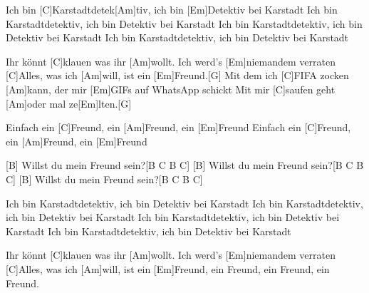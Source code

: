 

\begin{guitar}
	Ich bin [C]Karstadtdetek[Am]tiv, ich bin [Em]Detektiv bei Karstadt
	Ich bin Karstadtdetektiv, ich bin Detektiv bei Karstadt
	Ich bin Karstadtdetektiv, ich bin Detektiv bei Karstadt
	Ich bin Karstadtdetektiv, ich bin Detektiv bei Karstadt
	
	Ihr könnt [C]klauen was ihr [Am]wollt. Ich werd's [Em]niemandem verraten
	[C]Alles, was ich [Am]will, ist ein [Em]Freund.[G]{}
	Mit dem ich [C]FIFA zocken [Am]kann, der mir [Em]GIFs auf WhatsApp schickt
	Mit mir [C]saufen geht [Am]oder mal ze[Em]lten.[G]{}
	
	Einfach ein [C]Freund, ein [Am]Freund, ein [Em]Freund
	Einfach ein [C]Freund, ein [Am]Freund, ein [Em]Freund
	
	[B] Willst du mein Freund sein?[B C B C]{}
	[B] Willst du mein Freund sein?[B C B C]{}
	[B] Willst du mein Freund sein?[B C B C]{}
	
	Ich bin Karstadtdetektiv, ich bin Detektiv bei Karstadt
	Ich bin Karstadtdetektiv, ich bin Detektiv bei Karstadt
	Ich bin Karstadtdetektiv, ich bin Detektiv bei Karstadt
	Ich bin Karstadtdetektiv, ich bin Detektiv bei Karstadt
	
	Ihr könnt [C]klauen was ihr [Am]wollt. Ich werd's [Em]niemandem verraten
	[C]Alles, was ich [Am]will, ist ein [Em]Freund, ein Freund, ein Freund, ein Freund.
\end{guitar}